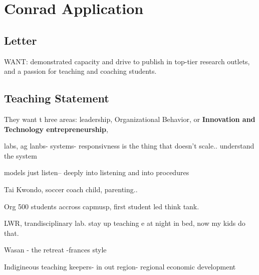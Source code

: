 \chapter{Conrad Application}








\section{Letter}

WANT: 
demonstrated  capacity and drive to publish in top-tier research outlets, and a passion for teaching and coaching students.

\section{Teaching Statement}
They want t hree areas: leadership, Organizational Behavior, or \textbf{Innovation and Technology entrepreneurship},

labs, ag lanbs- systems- 
responsivness is the thing that doesn't scale.. understand the system

models
just listen-- deeply into listening and into procedures

Tai Kwondo, soccer coach child, parenting.. 

Org 500 students accross capmusp, first student led think tank.

LWR, trandisciplinary lab.
stay up teaching e at night in bed, now my kids do that.

Wasan - the retreat -frances style

Indigineous teaching keepers- in out region- regional economic development

